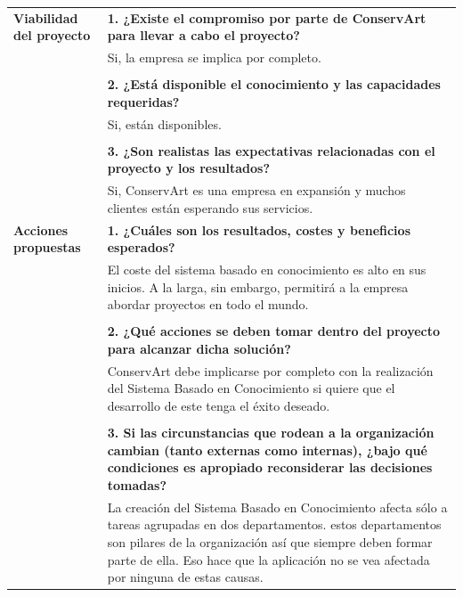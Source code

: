 \documentclass[a4paper,11pt]{article}
\begin{document}
			\newpage
			\begin{center}
				\begin{tabular}{| p{4.5cm} | p{7cm} |}
					\hline
					\cellcolor[RGB]{224,233,250}\textbf{Viabilidad del proyecto} & 
					\textbf{1. ¿Existe el compromiso por parte de ConservArt para llevar a
					cabo el proyecto?}\\
					\cellcolor[RGB]{224,233,250}& Si, la empresa se implica por completo.\\
					\cellcolor[RGB]{224,233,250}& \\
					\cellcolor[RGB]{224,233,250}& \textbf{2. ¿Está disponible el conocimiento y
					las capacidades requeridas?}\\
					\cellcolor[RGB]{224,233,250}& Si, están disponibles.\\
					\cellcolor[RGB]{224,233,250}& \\
					\cellcolor[RGB]{224,233,250}& \textbf{3. ¿Son realistas las expectativas
					relacionadas con el proyecto y los resultados?}\\
					\cellcolor[RGB]{224,233,250}& Si, ConservArt es una empresa en expansión y
					muchos clientes están esperando sus servicios.\\
					\hline
					\cellcolor[RGB]{224,233,250}\textbf{Acciones propuestas} & 
					\textbf{1. ¿Cuáles son los resultados, costes y beneficios esperados?}\\
					\cellcolor[RGB]{224,233,250}& El coste del sistema basado en conocimiento
					es alto en sus inicios. A la larga, sin embargo, permitirá a la empresa abordar proyectos en todo el
					mundo.\\
					\cellcolor[RGB]{224,233,250}& \\
					\cellcolor[RGB]{224,233,250}& \textbf{2. ¿Qué acciones se deben tomar
					dentro del proyecto para alcanzar dicha solución?}\\
					\cellcolor[RGB]{224,233,250}& ConservArt debe implicarse por completo con
					la realización del Sistema Basado en Conocimiento si quiere que el desarrollo de este tenga el éxito deseado.\\
					\cellcolor[RGB]{224,233,250}& \\
					\cellcolor[RGB]{224,233,250}& \textbf{3. Si las circunstancias que rodean a
					la organización cambian (tanto externas como internas), ¿bajo qué condiciones es apropiado
					reconsiderar las decisiones tomadas?}\\
					\cellcolor[RGB]{224,233,250}& La creación del Sistema Basado en
					Conocimiento afecta sólo a tareas agrupadas en dos departamentos. estos departamentos son pilares de la organización así que siempre deben formar parte de ella. Eso hace que la aplicación no se vea afectada por ninguna de estas causas.\\
					\hline
				\end{tabular}
			\end{center}
		\newpage
\end{document}
